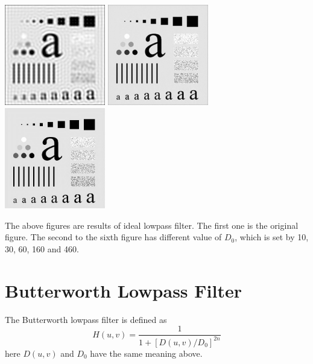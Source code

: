 \documentclass{article}
\begin{document}
\includegraphics[width=0.33\textwidth]{../data/ideal_lowpass_60_characters_test_pattern.jpg}
\includegraphics[width=0.33\textwidth]{../data/ideal_lowpass_160_characters_test_pattern.jpg}
\includegraphics[width=0.33\textwidth]{../data/ideal_lowpass_460_characters_test_pattern.jpg}

The above figures are results of ideal lowpass filter. The first one is the original figure. The second to the sixth figure has different value of $D_0$, which is set by 10, 30, 60, 160 and 460.

\section{Butterworth Lowpass Filter}
The Butterworth lowpass filter is defined as $$H(u,v)=\frac{1}{1+[D(u,v)/D_0]^{2n}}$$ here $D(u,v)$ and $D_0$ have the same meaning above.
\end{document}
